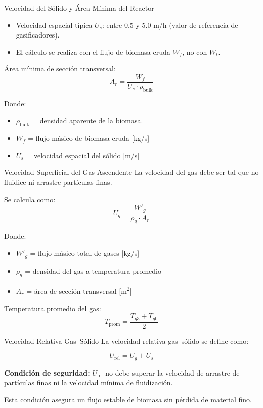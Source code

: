 \documentclass[main.tex]{subfiles}
\begin{document}
\begin{frame}{Velocidad del Sólido y Área Mínima del Reactor}
  \begin{itemize}
    \item Velocidad espacial típica $U_s$: entre 0.5 y 5.0 m/h (valor de referencia de gasificadores).
    \item El cálculo se realiza con el flujo de biomasa cruda $W_f$, no con $W_t$.
  \end{itemize}

  Área mínima de sección transversal:
  \[
    A_r = \frac{W_f}{U_s \cdot \rho_{\text{bulk}}}
  \]

  Donde:
  \begin{itemize}
    \item $\rho_{\text{bulk}}$ = densidad aparente de la biomasa.
    \item $W_f$ = flujo másico de biomasa cruda [kg/s]
    \item $U_s$ = velocidad espacial del sólido [m/s]
  \end{itemize}
\end{frame}

\begin{frame}{Velocidad Superficial del Gas Ascendente}
  La velocidad del gas debe ser tal que no fluidice ni arrastre partículas finas.

  Se calcula como:
  \[
    U_g = \frac{W'_g}{\rho_g \cdot A_r}
  \]

  Donde:
  \begin{itemize}
    \item $W'_g$ = flujo másico total de gases [kg/s]
    \item $\rho_g$ = densidad del gas a temperatura promedio
    \item $A_r$ = área de sección transversal [m\textsuperscript{2}]
  \end{itemize}
  Temperatura promedio del gas:
  \[
    T_{\text{prom}} = \frac{T_{g3} + T_{g0}}{2}
  \]
\end{frame}

\begin{frame}{Velocidad Relativa Gas–Sólido}
  La velocidad relativa gas–sólido se define como:

  \[
    U_{\text{rel}} = U_g + U_s
  \]

  \textbf{Condición de seguridad:} $U_{\text{rel}}$ no debe superar la velocidad de arrastre de partículas finas ni la velocidad mínima de fluidización.

  \vspace{0.5em}
  Esta condición asegura un flujo estable de biomasa sin pérdida de material fino.
\end{frame}
\end{document}
